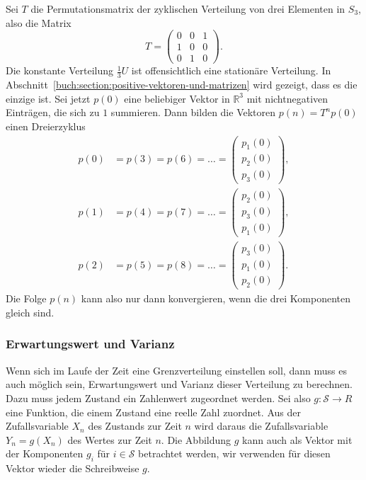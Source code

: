 \begin{beispiel}
Sei $T$ die Permutationsmatrix der zyklischen Verteilung von drei
Elementen in $S_3$, also die Matrix
\[
T=\begin{pmatrix}
0&0&1\\
1&0&0\\
0&1&0
\end{pmatrix}.
\]
Die konstante Verteilung $\frac13U$ ist offensichtlich eine
stationäre Verteilung.
In Abschnitt~\ref{buch:section:positive-vektoren-und-matrizen}
wird gezeigt, dass es die einzige ist.
Sei jetzt $p(0)$ eine beliebiger Vektor in $\mathbb{R}^3$ mit
nichtnegativen Einträgen, die sich zu $1$ summieren.
Dann bilden die Vektoren $p(n)=T^np(0)$ einen Dreierzyklus
\begin{align*}
p(0)&=p(3)=p(6)=\dots =\begin{pmatrix}p_1(0)\\p_2(0)\\p_3(0)\end{pmatrix},
\\
p(1)&=p(4)=p(7)=\dots =\begin{pmatrix}p_2(0)\\p_3(0)\\p_1(0)\end{pmatrix},
\\
p(2)&=p(5)=p(8)=\dots =\begin{pmatrix}p_3(0)\\p_1(0)\\p_2(0)\end{pmatrix}.
\end{align*}
Die Folge $p(n)$ kann also nur dann konvergieren, wenn die drei
Komponenten gleich sind.
\end{beispiel}

\subsubsection{Erwartungswert und Varianz}
Wenn sich im Laufe der Zeit eine Grenzverteilung einstellen soll, dann
muss es auch möglich sein, Erwartungswert und Varianz dieser Verteilung
zu berechnen.
Dazu muss jedem Zustand ein Zahlenwert zugeordnet werden.
Sei also
\(
g: \mathcal{S}\to R
\)
eine Funktion, die einem Zustand eine reelle Zahl zuordnet.
Aus der Zufallsvariable $X_n$ des Zustands zur Zeit $n$ wird daraus
die Zufallsvariable $Y_n=g(X_n)$ des Wertes zur Zeit $n$.
Die Abbildung $g$ kann auch als Vektor mit der Komponenten $g_i$ 
für $i\in\mathcal{S}$ betrachtet werden, wir verwenden für diesen
Vektor wieder die Schreibweise $g$.

